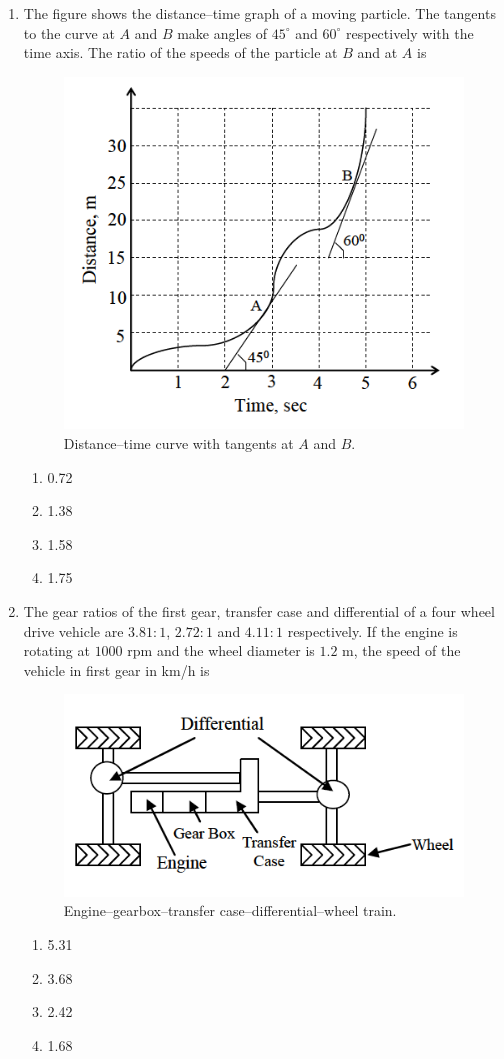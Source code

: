\documentclass[journal]{IEEEtran}
\begin{document}
\begin{enumerate}[leftmargin=0pt]
\item The figure shows the distance–time graph of a moving particle. The tangents to the curve at $A$ and $B$ make angles of $45^\circ$ and $60^\circ$ respectively with the time axis. The ratio of the speeds of the particle at $B$ and at $A$ is
\begin{figure}[H]
\centering
\includegraphics[width=0.6\linewidth]{figs/ratios.png}
\caption{Distance–time curve with tangents at $A$ and $B$.}
\end{figure}
\begin{multicols}{2}
\begin{enumerate}[label=(\Alph*),itemsep=0pt,topsep=2pt]
  \item 0.72
  \item 1.38
  \item 1.58
  \item 1.75
\end{enumerate}
\end{multicols}
\hfill{}

\item The gear ratios of the first gear, transfer case and differential of a four wheel drive vehicle are $3.81{:}1$, $2.72{:}1$ and $4.11{:}1$ respectively. If the engine is rotating at $1000$ rpm and the wheel diameter is $1.2$ m, the speed of the vehicle in first gear in km/h is
\begin{figure}[H]
\centering
\includegraphics[width=0.55\linewidth]{figs/gearratios.png}
\caption{Engine–gearbox–transfer case–differential–wheel train.}
\end{figure}
\begin{multicols}{2}
\begin{enumerate}[label=(\Alph*),itemsep=0pt,topsep=2pt]
  \item 5.31
  \item 3.68
  \item 2.42
  \item 1.68
\end{enumerate}
\end{multicols}
\hfill{}


\end{enumerate}
\end{document}
